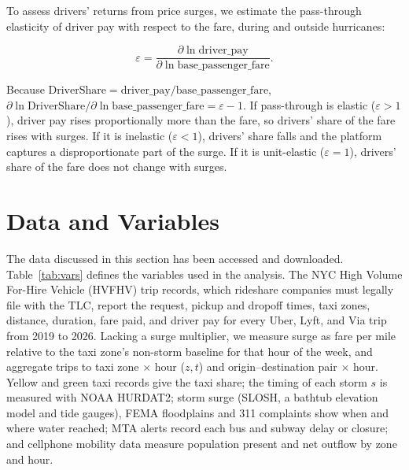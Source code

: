 \documentclass[11pt]{article}
\begin{document}
To assess drivers' returns from price surges, we estimate the pass-through elasticity of driver pay with respect to the fare, during and outside hurricanes:

\begin{equation}
\varepsilon = \frac{\partial \ln \text{driver\_pay}}{\partial \ln \text{base\_passenger\_fare}}.
\end{equation}

Because $\text{DriverShare} = \text{driver\_pay}/\text{base\_passenger\_fare}$, $\partial \ln \text{DriverShare} / \partial \ln \text{base\_passenger\_fare} = \varepsilon - 1$. If pass-through is elastic ($\varepsilon > 1$), driver pay rises proportionally more than the fare, so drivers' share of the fare rises with surges. If it is inelastic ($\varepsilon < 1$), drivers' share falls and the platform captures a disproportionate part of the surge. If it is unit-elastic ($\varepsilon = 1$), drivers' share of the fare does not change with surges.

\section{Data and Variables}

The data discussed in this section has been accessed and downloaded. Table~\ref{tab:vars} defines the variables used in the analysis. The NYC High Volume For-Hire Vehicle (HVFHV) trip records, which rideshare companies must legally file with the TLC, report the request, pickup and dropoff times, taxi zones, distance, duration, fare paid, and driver pay for every Uber, Lyft, and Via trip from 2019 to 2026. Lacking a surge multiplier, we measure surge as fare per mile relative to the taxi zone's non-storm baseline for that hour of the week, and aggregate trips to taxi zone $\times$ hour ($z,t$) and origin--destination pair $\times$ hour. Yellow and green taxi records give the taxi share; the timing of each storm $s$ is measured with NOAA HURDAT2; storm surge (SLOSH, a bathtub elevation model and tide gauges), FEMA floodplains and 311 complaints show when and where water reached; MTA alerts record each bus and subway delay or closure; and cellphone mobility data measure population present and net outflow by zone and hour.
\end{document}
